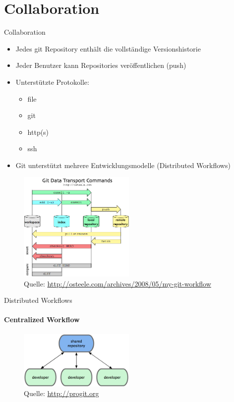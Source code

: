 \section{Collaboration}

\begin{frame}
  \tableofcontents[currentsection]
\end{frame}

\begin{frame}{Collaboration}
  \begin{itemize}
    \item Jedes git Repository enthält die vollständige Versionshistorie
    \item Jeder Benutzer kann Repositories veröffentlichen (push)
    \item Unterstützte Protokolle:
    \begin{itemize}
      \item file
      \item git
      \item http(s)
      \item ssh
    \end{itemize}
    \item Git unterstützt mehrere Entwicklungsmodelle (Distributed Workflows)
  \end{itemize}
\end{frame}

\begin{frame}
  \begin{figure}
    \includegraphics[width=0.5\textwidth]{img/git-transport}
    \caption[format=empty]{Quelle: \url{http://osteele.com/archives/2008/05/my-git-workflow}}
  \end{figure}

\end{frame}

\begin{frame}{Distributed Workflows}
  \framesubtitle{Centralized Workflow}
  \begin{figure}
    \includegraphics[width=0.5\textwidth]{img/wf-centralized}
    \caption[format=empty]{Quelle: \url{http://progit.org}}
  \end{figure}
\end{frame}

